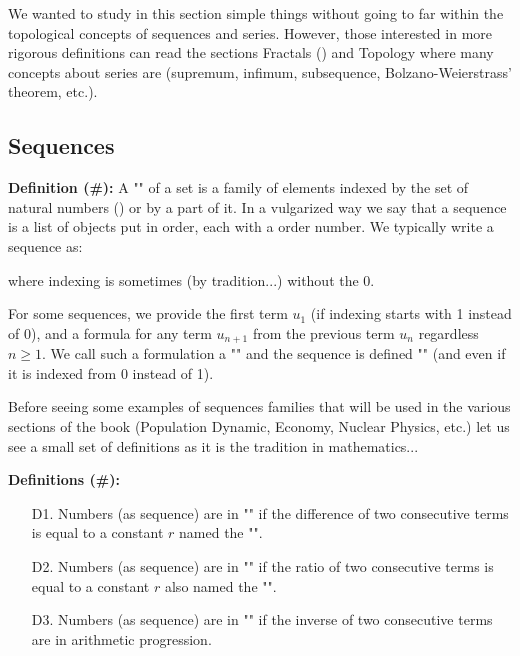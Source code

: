 We wanted to study in this section simple things without going to far within the topological concepts of sequences and series. However, those interested in more rigorous definitions can read the sections Fractals () and Topology where many concepts about series are  (supremum, infimum, subsequence, Bolzano-Weierstrass' theorem, etc.).

\subsection{Sequences}

\textbf{Definition (\#\mydef):} A "" of a set is a family of elements indexed by the set of natural numbers () or by a part of it. In a vulgarized way we say that a sequence is a list of objects put in order, each with a order number. We typically write a sequence as:
	
where indexing is sometimes (by tradition...) without the 0.

For some sequences, we provide the first term $u_1$ (if indexing starts with 1 instead of 0), and a formula for any term $u_{n+1}$ from the previous term $u_n$ regardless $n \geq 1$. We call such a formulation a "" and the sequence is defined "" (and even if it is indexed from 0 instead of 1).

Before seeing some examples of sequences families that will be used in the various sections of the book (Population Dynamic, Economy, Nuclear Physics, etc.) let us see a small set of definitions as it is the tradition in mathematics...

\textbf{Definitions (\#\mydef):}
	\begin{enumerate}
		\item[D1.] Numbers (as sequence) are in "" if the difference of two consecutive terms is equal to a constant $r$ named the "".
		
		\item[D2.] Numbers (as sequence) are in "" if the ratio of two consecutive terms is equal to a constant $r$ also named the "".
		
		\item[D3.] Numbers (as sequence) are in "" if the inverse of two consecutive terms are in arithmetic progression.
	\end{enumerate}

